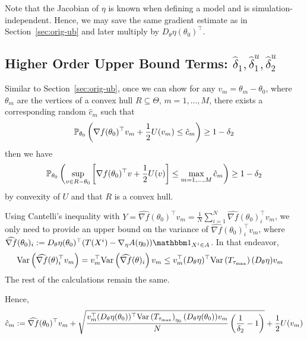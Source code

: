 \documentclass[10pt]{article}
\begin{document}
Note that the Jacobian of $\eta$ is known when defining a model 
and is simulation-independent.
Hence, we may save the same gradient estimate as in Section~\ref{sec:orig-ub}
and later multiply by $D_{\theta} \eta(\theta_0)^\top$.    

\subsection{Higher Order Upper Bound Terms: $\hat{\delta}_1, \hat{\delta}_1^u, \hat{\delta}_2^u$}
    
Similar to Section~\ref{sec:orig-ub},
once we can show for any $v_m = \theta_m - \theta_0$, 
where $\theta_m$ are the vertices of a convex hull $R \subseteq \Theta$,
$m=1,\ldots, M$,
there exists a corresponding random $\hat{c}_m$ such that
\[
    \PPP_{\theta_0}\paren{%
        \nabla f(\theta_0)^\top v_m
        +
        \frac{1}{2}U(v_m)
        \leq 
        \hat{c}_m
    } 
    \geq 1-\delta_2
\]
then we have
\[
    \PPP_{\theta_0}\paren{%
        \sup\limits_{v\in R-\theta_0} 
        \bracket{%
            \nabla f(\theta_0)^\top v
            + 
            \frac{1}{2}U(v)
        }
        \leq 
        \max\limits_{m=1,\ldots, M} \hat{c}_m
    } 
    \geq 
    1-\delta_2
\]
by convexity of $U$ and that $R$ is a convex hull.

Using Cantelli's inequality
with $Y = \widehat{\nabla f}(\theta_0)^\top v_m = \frac{1}{N} \sum\limits_{i=1}^N \widehat{\nabla f}(\theta_0)_i^\top v_m$,
we only need to provide an upper bound on the variance of $\widehat{\nabla f}(\theta_0)_i^\top v_m$,
where $\widehat{\nabla f}(\theta_0)_i := D_\theta \eta(\theta_0)^\top (T(X^i)-\nabla_\eta A(\eta_0)) \indic{X^i \in A}$.
In that endeavor,
\begin{align*}
    \text{Var}\left(\widehat{\nabla f}(\theta)_i^\top v_m\right)
    &=
    v_m^\top \text{Var}\left(\widehat{\nabla f}(\theta)_i\right) v_m
    \leq 
    v_m^\top (D_\theta \eta)^\top \text{Var}\left(T_{\tau_{\max}}\right) (D_\theta \eta) v_m
\end{align*}
The rest of the calculations remain the same.

Hence, 
\begin{align*}
    \hat{c}_m
    :=
    \widehat{\nabla f}(\theta_0)^\top v_m
    +
    \sqrt{
        \frac{v_m^\top (D_\theta \eta(\theta_0))^\top \text{Var}\left(T_{\tau_{\max}}\right)_{\eta_0} (D_\theta \eta(\theta_0)) v_m}{N}
        \left(\frac{1}{\delta_2} - 1\right)
    }
    +
    \frac{1}{2} U(v_m)
\end{align*}
\end{document}
